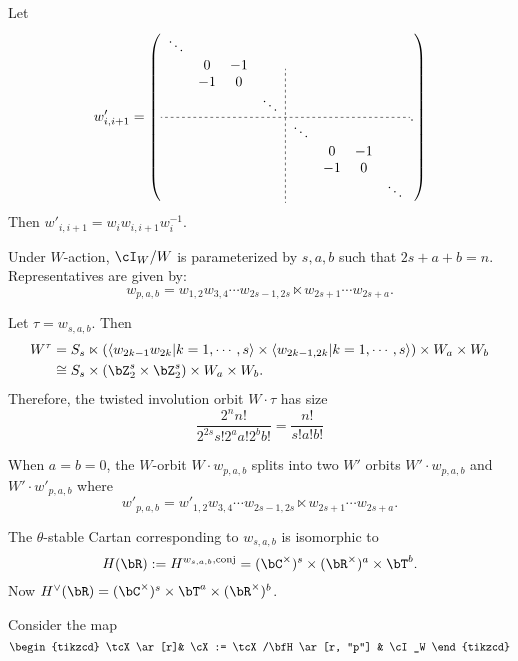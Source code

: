 \documentclass[12pt,a4paper]{amsart}
\def\gen#1{\left\langle
    #1
      \right\rangle}
\numberwithin{equation}{section}
\theoremstyle{remark}
\begin{document}
Let
\[
  w'_{i,i+1}= \left(
    \begin{array}{cccc;{2pt/2pt}cccc}
      \ddots &    &   &        &        &    &   &        \\
        & 0  & -1 &        &        &    &   &        \\
        & -1 & 0 &        &        &    &   &        \\
        &    &   & \ddots &        &    &   &        \\
      \hdashline[2pt/2pt]
        &    &   &        & \ddots &    &   &        \\
        &    &   &        &        & 0  & -1          \\
        &    &   &        &        & -1 & 0 &        \\
        &    &   &        &        &    &   & \ddots \\
    \end{array}.
  \right)
\]
Then $w'_{i,i+1}= w_i w_{i,i+1} w_i^{-1}$.

Under $W$-action, $\cI_W/W$ is parameterized by $s,a,b$ such that $2s+a+b=n$.
Representatives are given by:
\[
  w_{p,a,b}= w_{1,2}w_{3,4}\cdots w_{2s-1,2s}\ltimes w_{2s+1}\cdots w_{2s+a}.
\]


Let $\tau = w_{s,a,b}$.  Then
\[
  \begin{split}
    W^\tau & = S_s \ltimes ( \gen{w_{2k-1}w_{2k}|k=1,\cdots, s}\times
    \gen{w_{2k-1,2k}|k=1,\cdots, s} )\times W_a\times W_b \\
    &\cong S_s\times(\bZ_2^s\times \bZ_2^s) \times W_a\times W_b.
  \end{split}
\]
Therefore, the twisted involution orbit $W\cdot \tau$ has size
\[
  \frac{2^n n!}{2^{2s} s! 2^a a! 2^b b!} = \frac{n!}{s!a!b!}
\]

When $a=b=0$, the $W$-orbit $W\cdot w_{p,a,b}$ splits into two $W'$ orbits
$W' \cdot w_{p,a,b}$ and $W'\cdot w'_{p,a,b}$ where
\[
  w'_{p,a,b}= w'_{1,2}w_{3,4}\cdots w_{2s-1,2s}\ltimes w_{2s+1}\cdots w_{2s+a}.
\]

The $\theta$-stable Cartan corresponding to $w_{s,a,b}$ is isomorphic to
\[
  H(\bR):=H^{w_{s,a,b}, \mathrm{conj}}= (\bC^\times )^s\times
  (\bR^\times)^a\times \bT^b.
\]
Now $H^\vee(\bR) = (\bC^\times)^s \times \bT^a\times (\bR^\times)^b$.

Consider the map
\[
  \begin{tikzcd}
    \tcX\ar[r]& \cX := \tcX/\bfH \ar[r, "p"] & \cI_W
  \end{tikzcd}
\]
\end{document}
